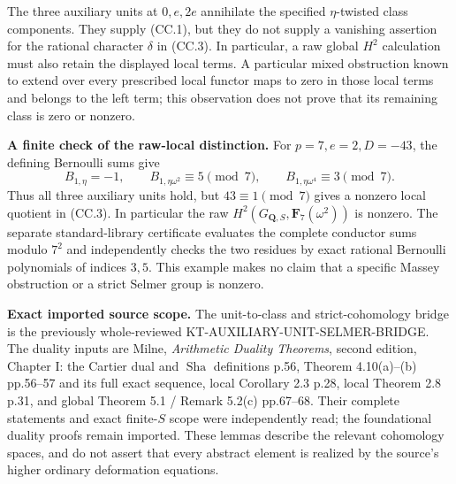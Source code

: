 \documentclass[11pt,a4paper]{article}
\theoremstyle{definition}
\renewcommand{\paragraph}[1]{\par\smallskip\noindent\textbf{#1}\quad\ignorespaces}
\newcommand{\Sha}{\operatorname{Sha}}
\begin{document}
The three auxiliary units at $0,e,2e$ annihilate the specified
$\eta$-twisted class components.  They supply (CC.1), but they
do not supply a vanishing assertion for the rational character
$\delta$ in (CC.3).  In particular, a raw global $H^2$ calculation
must also retain the displayed local terms.  A particular mixed
obstruction known to extend over every prescribed local functor
maps to zero in those local terms and belongs to the left term;
this observation does not prove that its remaining class is
zero or nonzero.

\paragraph{A finite check of the raw-local distinction.}
For $p=7,e=2,D=-43$, the defining Bernoulli sums give
\[
 B_{1,\eta}=-1,\qquad
 B_{1,\eta\omega^2}\equiv5\pmod7,\qquad
 B_{1,\eta\omega^4}\equiv3\pmod7.                    \tag{CC.4}
\]
Thus all three auxiliary units hold, but $43\equiv1\pmod7$
gives a nonzero local quotient in (CC.3).  In particular the
raw $H^2(G_{\mathbf Q,S},\mathbf F_7(\omega^2))$ is nonzero.
The separate standard-library certificate
 evaluates the
complete conductor sums modulo $7^2$ and independently checks
the two residues by exact rational Bernoulli polynomials of
indices $3,5$.  This example makes no claim that a specific
Massey obstruction or a strict Selmer group is nonzero.

\paragraph{Exact imported source scope.}
The unit-to-class and strict-cohomology bridge is the previously
whole-reviewed KT-AUXILIARY-UNIT-SELMER-BRIDGE.  The duality
inputs are Milne, \emph{Arithmetic Duality Theorems}, second
edition, Chapter I: the Cartier dual and $\Sha$ definitions
p.56, Theorem 4.10(a)--(b) pp.56--57 and its full exact sequence,
local Corollary 2.3 p.28, local Theorem 2.8 p.31, and global
Theorem 5.1 / Remark 5.2(c) pp.67--68.  Their complete statements
and exact finite-$S$ scope were independently read; the
foundational duality proofs remain imported.  These lemmas
describe the relevant cohomology spaces, and do not assert
that every abstract element is realized by the source's
higher ordinary deformation equations.



\end{document}
